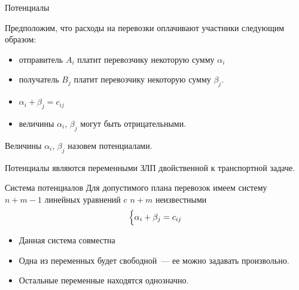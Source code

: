\documentclass[unicode,11pt,notheorems,xcolor=table]{beamer}
\begin{document}
\begin{frame}{Потенциалы}{}
	
	Предположим, что расходы на перевозки оплачивают участники следующим образом:
	\begin{itemize}
		\item 
		отправитель $A_i$ платит перевозчику некоторую сумму $\alpha_i$
		\item 
		получатель $B_j$ платит перевозчику некоторую сумму $\beta_j$.
		\item $\alpha_i+\beta_j=c_{ij}$
		\item величины $\alpha_i$, $\beta_j$ могут быть отрицательными.
	\end{itemize}
	Величины $\alpha_i$, $\beta_j$ назовем \alert{потенциалами}.
	
	\begin{block}{}
		Потенциалы являются переменными ЗЛП двойственной к транспортной задаче.
	\end{block}
\end{frame}

\begin{frame}{Система потенциалов}{}
	Для допустимого плана перевозок имеем систему $n+m-1$ линейных уравнений c $n+m$ неизвестными
	$$
	\Bigl\{ \alpha_i+\beta_j=c_{ij} \Bigr.
	$$
	\begin{itemize}
		\item 
		Данная система совместна
		\item 
		Одна из переменных будет свободной~--- ее можно задавать произвольно.
		\item 
		Остальные переменные находятся однозначно.
	\end{itemize}
\end{frame}




\end{document}
